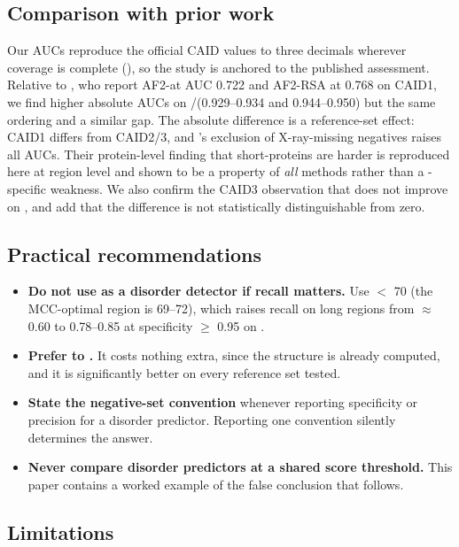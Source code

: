 \subsection{Comparison with prior work}

Our AUCs reproduce the official CAID values to three decimals wherever coverage is complete
(), so the study is anchored to the published assessment. Relative to
\citet{kurgan2023}, who report AF2-\plddt at AUC 0.722 and AF2-RSA at 0.768 on CAID1, we find
higher absolute AUCs on \caidtwo/\caidthree \dpdb (0.929--0.934 and 0.944--0.950) but the same
ordering and a similar gap. The absolute difference is a reference-set effect: CAID1 differs
from CAID2/3, and \dpdb's exclusion of X-ray-missing negatives raises all AUCs. Their
protein-level finding that short-\idr proteins are harder is reproduced here at region level and
shown to be a property of \emph{all} methods rather than a \plddt-specific weakness. We also
confirm the CAID3 observation that \afthreeplddt does not improve on \afplddt, and add that the
difference is not statistically distinguishable from zero.

\subsection{Practical recommendations}

\begin{itemize}[leftmargin=*,itemsep=1pt,topsep=2pt]
    \item \textbf{Do not use \plddtrule as a disorder detector if recall matters.} Use
    \plddt $<$ 70 (the MCC-optimal region is 69--72), which raises recall on long regions from
    $\approx$0.60 to 0.78--0.85 at specificity $\ge$ 0.95 on \dpdb.
    \item \textbf{Prefer \afrsa to \afplddt.} It costs nothing extra, since the structure is
    already computed, and it is significantly better on every reference set tested.
    \item \textbf{State the negative-set convention} whenever reporting specificity or precision
    for a disorder predictor. Reporting one convention silently determines the answer.
    \item \textbf{Never compare disorder predictors at a shared score threshold.} This paper
    contains a worked example of the false conclusion that follows.
\end{itemize}

\subsection{Limitations}

